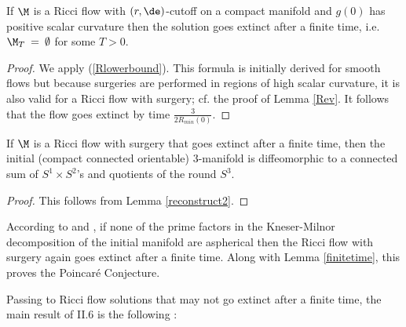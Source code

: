 \begin{lemma}
  \label{lem:kl-double-sided-curvature-bound-thick-part-compactness-thick-thin-geometry}
 \label{pscempty}
If $\M$ is a Ricci flow with $(r,\de)$-cutoff on a compact manifold and
$g(0)$ has positive scalar curvature then the solution goes extinct
after a finite time, i.e. $\M_T \: = \: \emptyset$ for some $T > 0$.
\end{lemma}
\begin{proof}
We apply (\ref{Rlowerbound}). This
formula is initially derived for smooth flows but because surgeries are
performed in regions of high scalar curvature, it is also valid for a Ricci
flow with surgery; cf. the proof of Lemma \ref{Rev}.
It follows that the flow goes extinct by time
$\frac{3}{2R_{min}(0)}$.
\end{proof}

\begin{lemma}
  \label{lem:kl-double-sided-curvature-bound-thick-part-compactness-ricci-flow-surgery}
 \label{finitetime}
If $\M$ is a Ricci flow with surgery that goes extinct after a finite time,
then the initial (compact connected orientable) $3$-manifold is diffeomorphic to a
connected sum of $S^1 \times S^2$'s and quotients of the round
$S^3$.
\end{lemma}
\begin{proof}
This follows from Lemma  \ref{reconstruct2}.
\end{proof}

According to \cite{Colding-Minicozzi,Colding-Minicozzi2} and
\cite{Perelman3}, if
none of the prime factors in the Kneser-Milnor decomposition of
the initial manifold are aspherical
then the Ricci flow with surgery again goes extinct
after a finite time.
Along with Lemma \ref{finitetime}, this proves the
Poincar\'e Conjecture.

Passing to Ricci flow solutions that may not go extinct after a finite time,
the main result of II.6 is the following :

